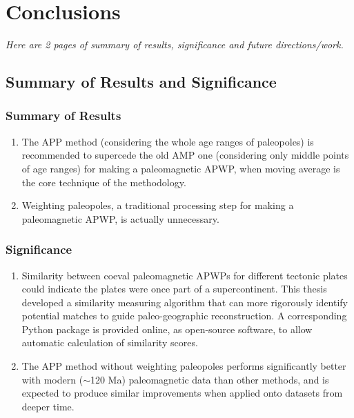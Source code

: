 \chapter{Conclusions}\label{chap:Concl}
\textit{Here are 2 pages of summary of results, significance and
future directions/work.}
\vfill
\minitoc\newpage

\section{Summary of Results and Significance}

\subsection{Summary of Results}

\begin{enumerate}
  \item The APP method (considering the whole age ranges of paleopoles) is
  recommended to supercede the old AMP one (considering only middle points of
  age ranges) for making a paleomagnetic APWP, when moving average is the core
  technique of the methodology.
  \item Weighting paleopoles, a traditional processing step for making a
  paleomagnetic APWP, is actually unnecessary.
\end{enumerate}

\subsection{Significance}

\begin{enumerate}
  \item Similarity between coeval paleomagnetic APWPs for different tectonic
    plates could indicate the plates were once part of a supercontinent. This
    thesis developed a similarity measuring algorithm that can more rigorously
    identify potential matches to guide paleo-geographic reconstruction. A
    corresponding Python package is provided online, as open-source software, to
    allow automatic calculation of similarity scores.
  \item The APP method without weighting paleopoles performs significantly
    better with modern ($\sim$120 Ma) paleomagnetic data than other
    methods, and is expected to produce similar improvements when applied onto
    datasets from deeper time.
\end{enumerate}

